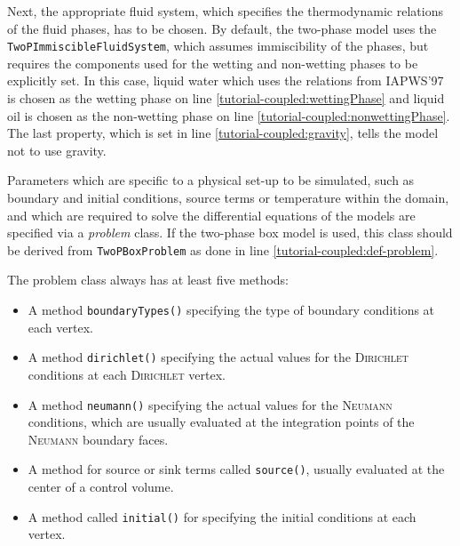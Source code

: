 Next, the appropriate fluid system, which specifies the thermodynamic
relations of the fluid phases, has to be chosen. By default, the
two-phase model uses the \texttt{TwoPImmiscibleFluidSystem}, which
assumes immiscibility of the phases, but requires the components
used for the wetting and non-wetting phases to be explicitly set. In
this case, liquid water which uses the relations from
IAPWS'97~\cite{IAPWS1997} is chosen as the wetting phase on line
\ref{tutorial-coupled:wettingPhase} and liquid oil is chosen as the
non-wetting phase on line \ref{tutorial-coupled:nonwettingPhase}. The
last property, which is set in line \ref{tutorial-coupled:gravity},
tells the model not to use gravity.

Parameters which are specific to a physical set-up to be simulated,
such as boundary and initial conditions, source terms or temperature
within the domain, and which are required to solve the differential
equations of the models are specified via a \textit{problem} class. If
the two-phase box model is used, this class should be derived from
\texttt{TwoPBoxProblem} as done in line
\ref{tutorial-coupled:def-problem}.

The problem class always has at least five methods:
\begin{itemize}
\item A method \texttt{boundaryTypes()} specifying the type of
  boundary conditions at each vertex.
\item A method \texttt{dirichlet()} specifying the actual values for
  the \textsc{Dirichlet} conditions at each \textsc{Dirichlet} vertex.
\item A method \texttt{neumann()} specifying the actual values for
  the \textsc{Neumann} conditions, which are usually evaluated at the 
  integration points of the \textsc{Neumann} boundary faces.
\item A method for source or sink terms called \texttt{source()}, usually evaluated at
  the center of a control volume.
\item A method called \texttt{initial()} for specifying the initial
  conditions at each vertex.
\end{itemize}

